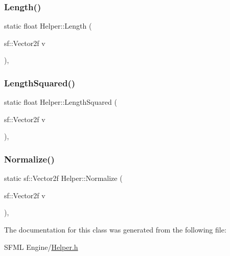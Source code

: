 \mbox{\label{class_helper_ad2b13a8d9fff4f913a57db9903df7709}} 
\subsubsection{\texorpdfstring{Length()}{Length()}}
{\footnotesize\ttfamily static float Helper\+::\+Length (\begin{DoxyParamCaption}\item[{sf\+::\+Vector2f}]{v }\end{DoxyParamCaption})\hspace{0.3cm}{\ttfamily [inline]}, {\ttfamily [static]}}

\mbox{\label{class_helper_ad6c52dd3a1875fbffc268196a6a6a887}} 
\subsubsection{\texorpdfstring{Length\+Squared()}{LengthSquared()}}
{\footnotesize\ttfamily static float Helper\+::\+Length\+Squared (\begin{DoxyParamCaption}\item[{sf\+::\+Vector2f}]{v }\end{DoxyParamCaption})\hspace{0.3cm}{\ttfamily [inline]}, {\ttfamily [static]}}

\mbox{\label{class_helper_a7565c8f3c91f44e139d7a4aaef6e0e34}} 
\subsubsection{\texorpdfstring{Normalize()}{Normalize()}}
{\footnotesize\ttfamily static sf\+::\+Vector2f Helper\+::\+Normalize (\begin{DoxyParamCaption}\item[{sf\+::\+Vector2f}]{v }\end{DoxyParamCaption})\hspace{0.3cm}{\ttfamily [inline]}, {\ttfamily [static]}}



The documentation for this class was generated from the following file\+:\begin{DoxyCompactItemize}
\item 
S\+F\+M\+L Engine/\hyperlink{_helper_8h}{Helper.\+h}\end{DoxyCompactItemize}

